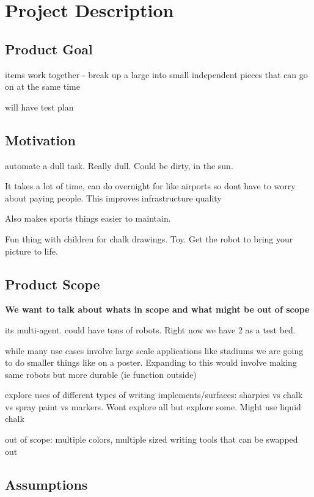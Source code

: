 
\section{Project Description}
\label{sec:project_description}

\subsection{Product Goal}
\label{sec:project_goal}
items work together - break up a large into small independent pieces that can go on at the same time

will have test plan

\subsection{Motivation}
\label{sec:motivation}
automate a dull task. Really dull. Could be dirty, in the sun. 

It takes a lot of time, can do overnight for like airports so dont have to worry about paying people. This improves infrastructure quality

Also makes sports things easier to maintain.

Fun thing with children for chalk drawings. Toy. Get the robot to bring your picture to life. 

\subsection{Product Scope}
\label{sec:project_scope}
\textbf{We want to talk about whats in scope and what might be out of scope}

its multi-agent. could have tons of robots. Right now we have 2 as a test bed. 

while many use cases involve large scale applications like stadiums we are going to do smaller things like on a poster. Expanding to this would involve making same robots but more durable (ie function outside)

explore uses of different types of writing implements/surfaces: sharpies vs chalk vs spray paint vs markers. Wont explore all but explore some. Might use liquid chalk

out of scope: multiple colors, multiple sized writing tools that can be swapped out

\subsection{Assumptions}
\label{sec:assumptions}

